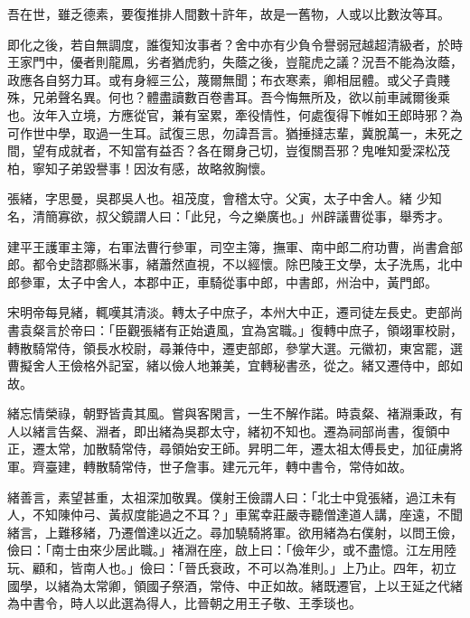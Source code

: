 \begin{pinyinscope}
 吾在世，雖乏德素，要復推排人間數十許年，故是一舊物，人或以比數汝等耳。



 即化之後，若自無調度，誰復知汝事者？舍中亦有少負令譽弱冠越超清級者，於時王家門中，優者則龍鳳，劣者猶虎豹，失蔭之後，豈龍虎之議？況吾不能為汝蔭，政應各自努力耳。或有身經三公，蔑爾無聞；布衣寒素，卿相屈體。或父子貴賤殊，兄弟聲名異。何也？體盡讀數百卷書耳。吾今悔無所及，欲以前車誡爾後乘也。汝年入立境，方應從官，兼有室累，牽役情性，何處復得下帷如王郎時邪？為可作世中學，取過一生耳。試復三思，勿諱吾言。猶捶撻志輩，冀脫萬一，未死之間，望有成就者，不知當有益否？各在爾身己切，豈復關吾邪？鬼唯知愛深松茂柏，寧知子弟毀譽事！因汝有感，故略敘胸懷。



 張緒，字思曼，吳郡吳人也。祖茂度，會稽太守。父寅，太子中舍人。緒
 少知名，清簡寡欲，叔父鏡謂人曰：「此兒，今之樂廣也。」州辟議曹從事，舉秀才。



 建平王護軍主簿，右軍法曹行參軍，司空主簿，撫軍、南中郎二府功曹，尚書倉部郎。都令史諮郡縣米事，緒蕭然直視，不以經懷。除巴陵王文學，太子洗馬，北中郎參軍，太子中舍人，本郡中正，車騎從事中郎，中書郎，州治中，黃門郎。



 宋明帝每見緒，輒嘆其清淡。轉太子中庶子，本州大中正，遷司徒左長史。吏部尚書袁粲言於帝曰：「臣觀張緒有正始遺風，宜為宮職。」復轉中庶子，領翊軍校尉，轉散騎常侍，領長水校尉，尋兼侍中，遷吏部郎，參掌大選。元徽初，東宮罷，選曹擬舍人王儉格外記室，緒以儉人地兼美，宜轉秘書丞，從之。緒又遷侍中，郎如故。



 緒忘情榮祿，朝野皆貴其風。嘗與客閑言，一生不解作諾。時袁粲、褚淵秉政，有人以緒言告粲、淵者，即出緒為吳郡太守，緒初不知也。遷為祠部尚書，復領中
 正，遷太常，加散騎常侍，尋領始安王師。昇明二年，遷太祖太傅長史，加征虜將軍。齊臺建，轉散騎常侍，世子詹事。建元元年，轉中書令，常侍如故。



 緒善言，素望甚重，太祖深加敬異。僕射王儉謂人曰：「北士中覓張緒，過江未有人，不知陳仲弓、黃叔度能過之不耳？」車駕幸莊嚴寺聽僧達道人講，座遠，不聞緒言，上難移緒，乃遷僧達以近之。尋加驍騎將軍。欲用緒為右僕射，以問王儉，儉曰：「南士由來少居此職。」褚淵在座，啟上曰：「儉年少，或不盡憶。江左用陸玩、顧和，皆南人也。」儉曰：「晉氏衰政，不可以為准則。」上乃止。四年，初立國學，以緒為太常卿，領國子祭酒，常侍、中正如故。緒既遷官，上以王延之代緒為中書令，時人以此選為得人，比晉朝之用王子敬、王季琰也。




\end{pinyinscope}
